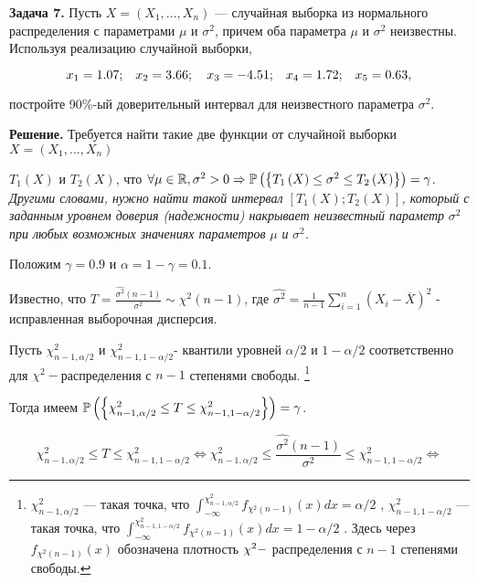 \textbf{Задача 7.}  Пусть $X=\left(X_{1} ,...,X_{n} \right)$ --- случайная выборка из нормального распределения с параметрами $\mu $ и $\sigma ^{2} $, причем оба параметра $\mu $ и $\sigma ^{2} $ неизвестны. Используя реализацию случайной выборки, 

\[x_{1} ={\rm 1.07;}\quad x_{2} ={\rm 3.66};\quad x_{3} =-{\rm 4.51;}\quad x_{4} ={\rm 1.72;}\quad x_{5} ={\rm 0.63,}\] 

постройте 90\%-ый доверительный интервал для неизвестного параметра $\sigma ^{2} $.

\textbf{Решение.} Требуется найти такие две функции от случайной выборки $X=\left(X_{1} ,...,X_{n} \right)$ 

$T_{1} \left(X\right)$ и $T_{2} \left(X\right)$, что $\forall \mu \in {\mathbb R},\sigma ^{2} >0\Rightarrow {\rm {\mathbb P}}\left(\left\{T_{1} \left(X\right)\le \sigma ^{2} \le T_{2} \left(X\right)\right\}\right)=\gamma $. \textit{Другими словами, нужно найти такой интервал $\left[T_{1} \left(X\right);T_{2} \left(X\right)\right]$, который с заданным уровнем доверия (надежности) накрывает неизвестный параметр }$\sigma ^{2} $\textit{ при любых возможных значениях параметров} $\mu $\textit{ и }$\sigma ^{2} $\textit{.}

Положим $\gamma =0.9$ и $\alpha =1-\gamma =0.1$.

Известно, что $T=\frac{\widehat{\sigma ^{2} }\left(n-1\right)}{\sigma ^{2} } \sim \chi ^{2} \left(n-1\right)$, где $\widehat{\sigma ^{2} }={\tfrac{1}{n-1}} \sum _{i=1}^{n}\left(X_{i} -\overline{X}\right)^{2}  $ - исправленная выборочная дисперсия.

Пусть $\chi _{n-1,\alpha /2}^{2} $ и $\chi _{n-1,1-\alpha /2}^{2} $- квантили уровней $\alpha /2$ и $1-\alpha /2$ соответственно для $\chi ^{2} -$распределения с $n-1$ степенями свободы. \footnote{  $\chi _{n-1,\alpha /2}^{2} $  --- такая точка, что  $\int _{-\infty }^{\chi _{n-1,\alpha /2}^{2} }f_{\chi ^{2} \left(n-1\right)} \left(x\right)dx =\alpha /2$ ,  $\chi _{n-1,1-\alpha /2}^{2} $  --- такая точка, что  $\int _{-\infty }^{\chi _{n-1,1-\alpha /2}^{2} }f_{\chi ^{2} \left(n-1\right)} \left(x\right)dx =1-\alpha /2$ . Здесь через  $f_{\chi ^{2} \left(n-1\right)} \left(x\right)$  обозначена плотность  $\chi ^{2} {\rm -}$ распределения с  $n-1$  степенями свободы. }

Тогда имеем ${\rm {\mathbb P}}\left(\left\{\chi _{n-1,\alpha /2}^{2} \le T\le \chi _{n-1,1-\alpha /2}^{2} \right\}\right)=\gamma $.

\[\chi _{n-1,\alpha /2}^{2} \le T\le \chi _{n-1,1-\alpha /2}^{2} \Leftrightarrow \chi _{n-1,\alpha /2}^{2} \le \frac{\widehat{\sigma ^{2} }\left(n-1\right)}{\sigma ^{2} } \le \chi _{n-1,1-\alpha /2}^{2} \Leftrightarrow \] 

